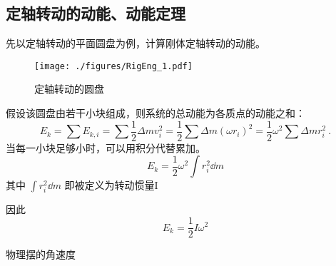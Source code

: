 
\begin{issues}
\issueDraft
{}
\end{issues}


\subsection{定轴转动的动能、动能定理}
先以定轴转动的平面圆盘为例，计算刚体定轴转动的动能。
\begin{figure}[ht]
\centering
\texttt{[image: ./figures/RigEng\_1.pdf]}
\caption{定轴转动的圆盘} \label{RigEng_fig1}
\end{figure}
假设该圆盘由若干小块组成，则系统的总动能为各质点的动能之和：
\begin{equation}
E_k=\sum E_{k,i}=\sum \frac{1}{2} \Delta m v_i^2=\frac{1}{2} \sum \Delta m (\omega r_i)^2=\frac{1}{2} \omega^2 \sum \Delta m r_i^2~.
\end{equation}
当每一小块足够小时，可以用积分代替累加。
\begin{equation}
E_k=\frac{1}{2} \omega^2 \int r_i^2 \dd m 
\end{equation}
其中 $\int r_i^2 \dd m$ 即被定义为转动惯量I

因此
\begin{equation}
E_k=\frac{1}{2} I \omega^2
\end{equation}


\begin{example}{物理摆的角速度}\label{RigEng_ex1}
\end{example}
